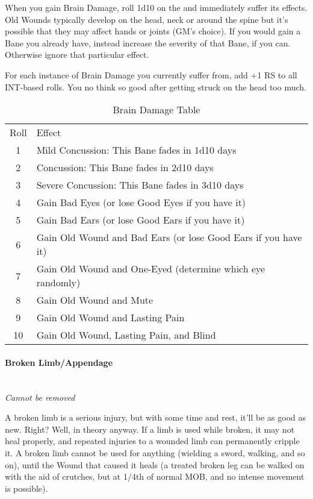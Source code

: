 \documentclass[oneside,11pt,english]{book}
\begin{document}
When you gain Brain Damage, roll 1d10 on the  and immediately suffer its effects.\\
Old Wounds typically develop on the head, neck or around the spine but it’s possible that they may affect hands or joints (GM’s choice). If you would gain a Bane you already have, instead increase the severity of that Bane, if you can. Otherwise ignore that particular effect.


For each instance of Brain Damage you currently suffer from, add +1 RS to all INT-based rolls. You no 
think so good after getting struck on the head too much. 
\begin{table}[!h]
	\caption{Brain Damage Table}
	\label{tab:Brain Damage}
	\begin{tabu} to \linewidth {cX}
		Roll&Effect\\
		1 &Mild Concussion: This Bane fades in 1d10 days \\
		2 &Concussion: This Bane fades in 2d10 days \\
		3 &Severe Concussion: This Bane fades in 3d10 days \\
		4 &Gain Bad Eyes (or lose Good Eyes if you have it) \\
		5 &Gain Bad Ears (or lose Good Ears if you have it) \\
		6 &Gain Old Wound and Bad Ears (or lose Good Ears if you have it) \\
		7 &Gain Old Wound and One-Eyed (determine which eye randomly) \\
		8 &Gain Old Wound and Mute \\
		9 &Gain Old Wound and Lasting Pain \\
		10&Gain Old Wound, Lasting Pain, and Blind \\
	\end{tabu}
\end{table}
\paragraph{\label{bane:Broken Limb/Appendage}Broken Limb/Appendage}\quad\\
\textit{Cannot be removed}\par
A broken limb is a serious injury, but with some time and rest, it’ll be as good as new. Right? 
Well, in theory anyway. If a limb is used while broken, it may not heal properly, and repeated injuries to a wounded limb can permanently cripple it. A broken limb cannot be used for anything (wielding a sword, walking, and so on), until the Wound that caused it heals (a treated broken leg can be walked on with the aid of crutches, but at 1/4th of normal MOB, and no intense movement is possible). 
\end{document}

